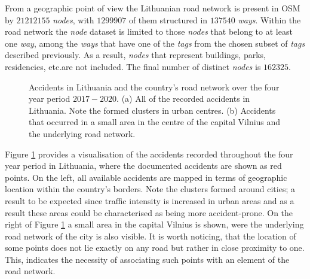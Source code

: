 \documentclass[12pt]{article}
\theoremstyle{definition}
\begin{document}
From a geographic point of view the Lithuanian road network is present in OSM by $21212155$ \textit{nodes}, with $1299907$ of them structured in $137540$ \textit{ways}. Within the road network the \textit{node} dataset is limited to those \textit{nodes} that belong to at least one \textit{way}, among the \textit{ways} that have one of the \textit{tags} from the chosen subset of \textit{tags} described previously. As a result, \textit{nodes} that represent buildings, parks, residencies, etc.\texttildelow are not included. The final number of distinct \textit{nodes} is $162325$.   

\begin{figure}[!ht]
    \centering
    \qquad
    \caption{Accidents in Lithuania and the country's road network over the four year period $2017-2020$. (a) All of the recorded accidents in Lithuania. Note the formed clusters in urban centres. (b) Accidents that occurred in a small area in the centre of the capital Vilnius and the underlying road network.}%
    \label{fig:AccidentsOSMmap}
\end{figure}
Figure \ref{fig:AccidentsOSMmap} provides a visualisation of the accidents recorded throughout the four year period in Lithuania, where the documented accidents are shown as red points. On the left, all available accidents are mapped in terms of geographic location within the country's borders. Note the clusters formed around cities; a result to be expected since traffic intensity is increased in urban areas and as a result these areas could be characterised as being more accident-prone. On the right of Figure \ref{fig:AccidentsOSMmap} a small area in the capital Vilnius is shown, were the underlying road network of the city is also visible. It is worth noticing, that the location of some points does not lie exactly on any road but rather in close proximity to one. This, indicates the necessity of associating such points with an element of the road network.
\end{document}
